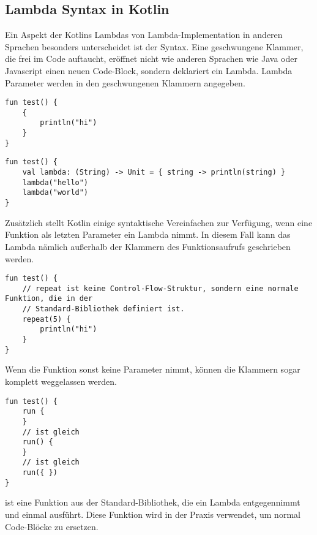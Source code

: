 \subsection{Lambda Syntax in Kotlin}
Ein Aspekt der Kotlins Lambdas von Lambda-Implementation in anderen Sprachen besonders unterscheidet ist der Syntax.
Eine geschwungene Klammer, die frei im Code auftaucht, eröffnet nicht wie anderen Sprachen wie \zB Java oder Javascript
einen neuen Code-Block, sondern deklariert ein Lambda.
Lambda Parameter werden in den geschwungenen Klammern angegeben.\cite{kspecLambdaLiteral}

\begin{verbatim}
fun test() {
    {
        println("hi")
    }
}
\end{verbatim}

\begin{verbatim}
fun test() {
    val lambda: (String) -> Unit = { string -> println(string) }
    lambda("hello")
    lambda("world")
}
\end{verbatim}

Zusätzlich stellt Kotlin einige syntaktische Vereinfachen zur Verfügung, wenn eine Funktion als letzten Parameter
ein Lambda nimmt.
In diesem Fall kann das Lambda nämlich außerhalb der Klammern des Funktionsaufrufs geschrieben werden.

\begin{verbatim}
fun test() {
    // repeat ist keine Control-Flow-Struktur, sondern eine normale Funktion, die in der
    // Standard-Bibliothek definiert ist.
    repeat(5) {
        println("hi")
    }
}
\end{verbatim}

Wenn die Funktion sonst keine Parameter nimmt, können die Klammern sogar komplett weggelassen werden.

\begin{verbatim}
fun test() {
    run {
    }
    // ist gleich
    run() {
    }
    // ist gleich
    run({ })
}
\end{verbatim}

 ist eine Funktion aus der Standard-Bibliothek, die ein Lambda entgegennimmt und einmal ausführt.
Diese Funktion wird in der Praxis verwendet, um normal Code-Blöcke zu ersetzen.


